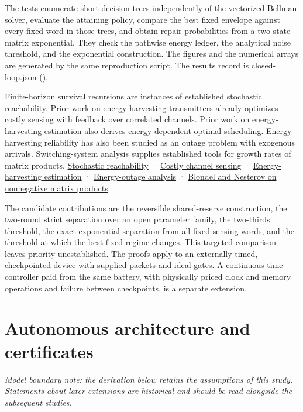 \documentclass[
  11pt,
]{article}
\begin{document}
The tests enumerate short decision trees independently of the vectorized
Bellman solver, evaluate the attaining policy, compare the best fixed
envelope against every fixed word in those trees, and obtain repair
probabilities from a two-state matrix exponential. They check the
pathwise energy ledger, the analytical noise threshold, and the
exponential construction. The figures and the numerical arrays are
generated by the same reproduction script. The results record is
closed-loop.json ().

Finite-horizon survival recursions are instances of established
stochastic reachability. Prior work on energy-harvesting transmitters
already optimizes costly sensing with feedback over correlated channels.
Prior work on energy-harvesting estimation also derives energy-dependent
optimal scheduling. Energy-harvesting reliability has also been studied
as an outage problem with exogenous arrivals. Switching-system analysis
supplies established tools for growth rates of matrix products.
\href{https://arxiv.org/abs/1407.5449}{Stochastic reachability} ·
\href{https://arxiv.org/abs/1703.10519}{Costly channel sensing} ·
\href{https://arxiv.org/abs/1908.06070}{Energy-harvesting estimation} ·
\href{https://arxiv.org/abs/1702.01648}{Energy-outage analysis} ·
\href{https://perso.uclouvain.be/vincent.blondel/publications/09BN.pdf}{Blondel
and Nesterov on nonnegative matrix products}

The candidate contributions are the reversible shared-reserve
construction, the two-round strict separation over an open parameter
family, the two-thirds threshold, the exact exponential separation from
all fixed sensing words, and the threshold at which the best fixed
regime changes. This targeted comparison leaves priority unestablished.
The proofs apply to an externally timed, checkpointed device with
supplied packets and ideal gates. A continuous-time controller paid from
the same battery, with physically priced clock and memory operations and
failure between checkpoints, is a separate extension.

\section{Autonomous architecture and
certificates}\label{autonomous-architecture-and-certificates}

\emph{Model boundary note: the derivation below retains the assumptions
of this study. Statements about later extensions are historical and
should be read alongside the subsequent studies.}
\end{document}
